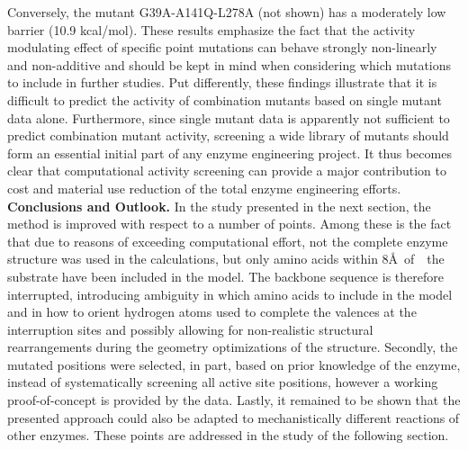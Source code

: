 Conversely, the mutant G39A-A141Q-L278A (not shown) has a moderately low barrier (10.9 kcal/mol).
These results emphasize the fact that the activity modulating effect of specific point mutations can behave strongly non-linearly and non-additive and should be kept in mind when considering which mutations to include in further studies.
Put differently, these findings illustrate that it is difficult to predict the activity of combination mutants based on single mutant data alone.
Furthermore, since single mutant data is apparently not sufficient to predict combination mutant activity, screening a wide library of mutants should form an essential initial part of any enzyme engineering project.
It thus becomes clear that computational activity screening can provide a major contribution to cost and material use reduction of the total enzyme engineering efforts.\\
\textbf{Conclusions and Outlook.}
In the study presented in the next section, the method is improved with respect to a number of points.
Among these is the fact that due to reasons of exceeding computational effort, not the complete enzyme structure was used in the calculations, but only amino acids within 8\AA \mbox{ of } the substrate have been included in the model.
The backbone sequence is therefore interrupted, introducing ambiguity in which amino acids to include in the model and in how to orient hydrogen atoms used to complete the valences at the interruption sites and possibly allowing for non-realistic structural rearrangements during the geometry optimizations of the structure.
Secondly, the mutated positions were selected, in part, based on prior knowledge of the enzyme, instead of systematically screening all active site positions, however a working proof-of-concept is provided by the data.
Lastly, it remained to be shown that the presented approach could also be adapted to mechanistically different reactions of other enzymes.
These points are addressed in the study of the following section.

